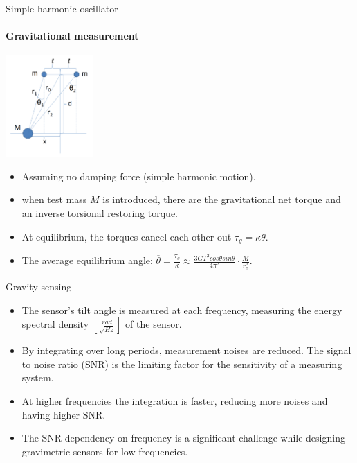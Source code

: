 \documentclass{beamer}
\begin{document}
\begin{frame}{Simple harmonic oscillator}
	\framesubtitle{Gravitational measurement}
	\begin{center}		
		\includegraphics[width=0.25\textwidth,keepaspectratio]{Cavendish apparatus.PNG}
    \end{center}
	\begin{itemize}
		\item Assuming no damping force (simple harmonic motion).
		\pause
		\item when test mass $M$ is introduced, there are the gravitational net torque and an inverse torsional restoring torque.
		\pause
		\item At equilibrium, the torques cancel each other out $\tau_g =  \kappa\theta$.
		\pause
		\item The average equilibrium angle: $\overline{\theta} = \frac{\tau_g}{\kappa} \approx \frac{3GT^2cos\theta sin\theta}{4\pi^2 } \cdot \frac{M}{r_0^3}$.
		
	\end{itemize}
\end{frame}
\begin{frame}{Gravity sensing}
	
	
	\begin{itemize}
		
		\item The sensor's tilt angle is measured at each frequency, measuring the energy spectral density $[\frac{rad}{\sqrt{Hz}}]$ of the sensor.
		\pause
		\item By integrating over long periods, measurement noises are reduced. The signal to noise ratio (SNR) is the limiting factor for the sensitivity of a measuring system.
		\pause
		\item At higher frequencies the integration is faster, reducing more noises and having higher SNR.
		\pause
		\item The SNR dependency on frequency is a significant challenge while designing gravimetric sensors for low frequencies.

	\end{itemize}
\end{frame}
\end{document}
